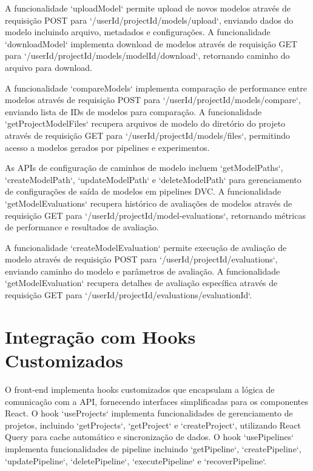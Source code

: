 \documentclass[12pt,a4paper]{article}
\begin{document}
A funcionalidade `uploadModel` permite upload de novos modelos através de requisição POST para `/{userId}/{projectId}/models/upload`, enviando dados do modelo incluindo arquivo, metadados e configurações. A funcionalidade `downloadModel` implementa download de modelos através de requisição GET para `/{userId}/{projectId}/models/{modelId}/download`, retornando caminho do arquivo para download.

A funcionalidade `compareModels` implementa comparação de performance entre modelos através de requisição POST para `/{userId}/{projectId}/models/compare`, enviando lista de IDs de modelos para comparação. A funcionalidade `getProjectModelFiles` recupera arquivos de modelo do diretório do projeto através de requisição GET para `/{userId}/{projectId}/models/files`, permitindo acesso a modelos gerados por pipelines e experimentos.

As APIs de configuração de caminhos de modelo incluem `getModelPaths`, `createModelPath`, `updateModelPath` e `deleteModelPath` para gerenciamento de configurações de saída de modelos em pipelines DVC. A funcionalidade `getModelEvaluations` recupera histórico de avaliações de modelos através de requisição GET para `/{userId}/{projectId}/model-evaluations`, retornando métricas de performance e resultados de avaliação.

A funcionalidade `createModelEvaluation` permite execução de avaliação de modelo através de requisição POST para `/{userId}/{projectId}/evaluations`, enviando caminho do modelo e parâmetros de avaliação. A funcionalidade `getModelEvaluation` recupera detalhes de avaliação específica através de requisição GET para `/{userId}/{projectId}/evaluations/{evaluationId}`.

\section{Integração com Hooks Customizados}

O front-end implementa hooks customizados que encapsulam a lógica de comunicação com a API, fornecendo interfaces simplificadas para os componentes React. O hook `useProjects` implementa funcionalidades de gerenciamento de projetos, incluindo `getProjects`, `getProject` e `createProject`, utilizando React Query para cache automático e sincronização de dados. O hook `usePipelines` implementa funcionalidades de pipeline incluindo `getPipeline`, `createPipeline`, `updatePipeline`, `deletePipeline`, `executePipeline` e `recoverPipeline`.
\end{document}
